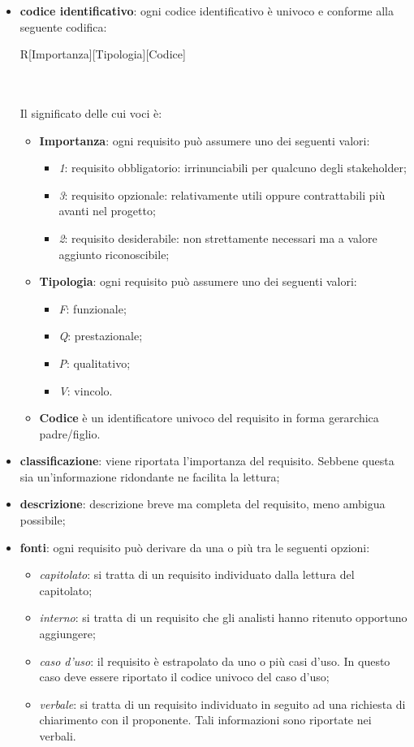 			\begin{itemize}
				\item \textbf{codice identificativo}: ogni codice identificativo è univoco e conforme alla seguente codifica: \\
				\centerline{R[Importanza][Tipologia][Codice]} \\ \\
				Il significato delle cui voci è:
				\begin{itemize}
					\item \textbf{Importanza}: ogni requisito può assumere uno dei seguenti valori:
					\begin{itemize}
						\item \textit{1}: requisito obbligatorio: irrinunciabili per qualcuno degli stakeholder;
						\item \textit{3}: requisito opzionale: relativamente utili oppure contrattabili più avanti nel progetto;
						\item \textit{2}: requisito desiderabile: non strettamente necessari ma  a valore aggiunto riconoscibile;	
					\end{itemize}
					\item \textbf{Tipologia}: ogni requisito può assumere uno dei seguenti valori:
					\begin{itemize}
						\item \textit{F}: funzionale;
						\item \textit{Q}: prestazionale;
						\item \textit{P}: qualitativo;
						\item \textit{V}: vincolo.
					\end{itemize}
					\item \textbf{Codice} è un identificatore univoco del requisito in forma gerarchica padre/figlio.
				\end{itemize}
				\item \textbf{classificazione}: viene riportata l'importanza del requisito. Sebbene questa sia un'informazione ridondante ne facilita la lettura;
				\item \textbf{descrizione}: descrizione breve ma completa del requisito, meno ambigua possibile;
				\item \textbf{fonti}: ogni requisito può derivare da una o più tra le seguenti opzioni:
				\begin{itemize}
					\item \textit{capitolato}: si tratta di un requisito individuato dalla lettura del capitolato;
					\item \textit{interno}: si tratta di un requisito che gli analisti hanno ritenuto opportuno aggiungere;
					\item \textit{caso d'uso}: il requisito è estrapolato da uno o più casi d'uso. In questo caso deve essere riportato il codice univoco del caso d'uso;
					\item \textit{verbale}: si tratta di un requisito individuato in seguito ad una richiesta di chiarimento con il proponente. Tali informazioni sono riportate nei verbali.
				\end{itemize}
			\end{itemize}

